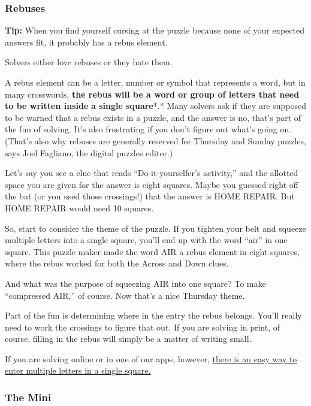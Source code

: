 \hypertarget{rebuses}{%
\subsubsection{Rebuses}\label{rebuses}}

\textbf{Tip:} When you find yourself cursing at the puzzle because none
of your expected answers fit, it probably has a rebus element.

Solvers either love rebuses or they hate them.~

A rebus element can be a letter, number or symbol that represents a
word, but in many crosswords, \textbf{the rebus will be a word or group
of letters that need to be written inside} \textbf{a single square}*.*
Many solvers ask if they are supposed to be warned that a rebus exists
in a puzzle, and the answer is no, that's part of the fun of solving.
It's also frustrating if you don't figure out what's going on. (That's
also why rebuses are generally reserved for Thursday and Sunday puzzles,
says Joel Fagliano, the digital puzzles editor.)

Let's say you see a clue that reads ``Do-it-yourselfer's activity,'' and
the allotted space you are given for the answer is eight squares. Maybe
you guessed right off the bat (or you used those crossings!) that the
answer is HOME REPAIR. But HOME REPAIR would need 10 squares.~

So, start to consider the theme of the puzzle. If you tighten your belt
and squeeze multiple letters into a single square, you'll end up with
the word ``air'' in one square. This puzzle maker made the word AIR a
rebus element in eight squares, where the rebus worked for both the
Across and Down clues.~

And what was the purpose of squeezing AIR into one square? To make
``compressed AIR,'' of course. Now that's a nice Thursday theme.

Part of the fun is determining where in the entry the rebus belongs.
You'll really need to work the crossings to figure that out. If you are
solving in print, of course, filling in the rebus will simply be a
matter of writing small.~

If you are solving online or in one of our apps, however,
\href{https://www.nytimes.com/2017/06/01/crosswords/yes-you-can-write-more-than-one-letter-in-a-square.html?_r=0}{there
is an easy way to enter multiple letters in a single square.}

\hypertarget{the-mini-13}{%
\subsubsection{The Mini}\label{the-mini-13}}

